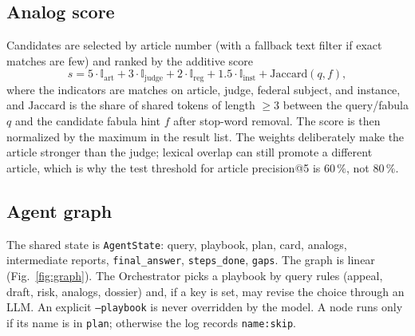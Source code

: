 \documentclass[preprint,12pt]{elsarticle}
\begin{document}
\subsection{Analog score}

Candidates are selected by article number (with a fallback text filter if exact matches are few) and ranked by the additive score
\begin{equation}
s = 5\cdot\mathbb{I}_{\mathrm{art}} + 3\cdot\mathbb{I}_{\mathrm{judge}} + 2\cdot\mathbb{I}_{\mathrm{reg}} + 1.5\cdot\mathbb{I}_{\mathrm{inst}} + \mathrm{Jaccard}(q, f),
\end{equation}
where the indicators are matches on article, judge, federal subject, and instance, and $\mathrm{Jaccard}$ is the share of shared tokens of length $\ge 3$ between the query/fabula $q$ and the candidate fabula hint $f$ after stop-word removal. The score is then normalized by the maximum in the result list. The weights deliberately make the article stronger than the judge; lexical overlap can still promote a different article, which is why the test threshold for article precision@5 is $60\,\%$, not $80\,\%$.

\subsection{Agent graph}

The shared state is \texttt{AgentState}: query, playbook, plan, card, analogs, intermediate reports, \texttt{final\_answer}, \texttt{steps\_done}, \texttt{gaps}. The graph is linear (Fig.~\ref{fig:graph}). The Orchestrator picks a playbook by query rules (appeal, draft, risk, analogs, dossier) and, if a key is set, may revise the choice through an LLM. An explicit \texttt{--playbook} is never overridden by the model. A node runs only if its name is in \texttt{plan}; otherwise the log records \texttt{name:skip}.
\end{document}
